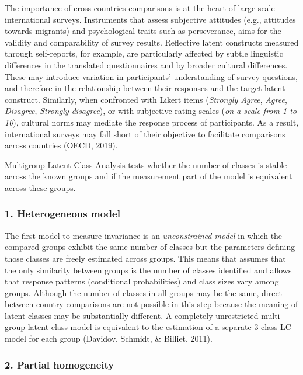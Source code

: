 \documentclass[12pt,a4paper,oneside]{reedthesis}
\begin{document}
The importance of cross-countries comparisons is at the heart of large-scale international surveys. Instruments that assess subjective attitudes (e.g., attitudes towards migrants) and psychological traits such as perseverance, aims for the validity and comparability of survey results. Reflective latent constructs measured through self-reports, for example, are particularly affected by subtle linguistic differences in the translated questionnaires and by broader cultural differences. These may introduce variation in participants' understanding of survey questions, and therefore in the relationship between their responses and the target latent construct. Similarly, when confronted with Likert items (\emph{Strongly Agree}, \emph{Agree}, \emph{Disagree}, \emph{Strongly disagree}), or with subjective rating scales (\emph{on a scale from 1 to 10}), cultural norms may mediate the response process of participants. As a result, international surveys may fall short of their objective to facilitate comparisons across countries (OECD, 2019).

Multigroup Latent Class Analysis tests whether the number of classes is stable across the known groups and if the measurement part of the model is equivalent across these groups.

\hypertarget{heterogeneous-model}{%
\subsubsection{1. Heterogeneous model}\label{heterogeneous-model}}

The first model to measure invariance is an \emph{unconstrained model} in which the compared groups exhibit the same number of classes but the parameters defining those classes are freely estimated across groups. This means that assumes that the only similarity between groups is the number of classes identified and allows that response patterns (conditional probabilities) and class sizes vary among groups. Although the number of classes in all groups may be the same, direct between-country comparisons are not possible in this step because the meaning of latent classes may be substantially different. A completely unrestricted multi-group latent class model is equivalent to the estimation of a separate 3-class LC model for each group (Davidov, Schmidt, \& Billiet, 2011).

\hypertarget{partial-homogeneity}{%
\subsubsection{2. Partial homogeneity}\label{partial-homogeneity}}
\end{document}
